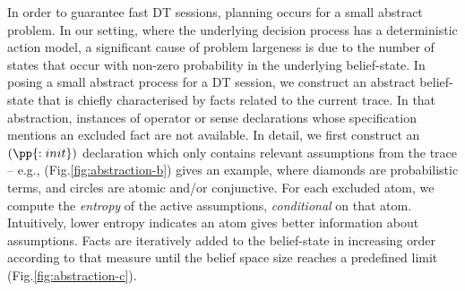 In order to guarantee fast DT sessions, planning occurs for a small
abstract problem. In our setting, where the underlying decision
process has a deterministic action model, a significant cause of
problem largeness is due to the number of states that occur with
non-zero probability in the underlying belief-state. In posing a small
abstract process for a DT session, we construct an abstract
belief-state that is chiefly characterised by facts related to the
current trace. In that abstraction, instances of operator or sense
declarations whose specification mentions an excluded fact are not
available.
In detail, we first construct an $(\pp{:init})$ declaration which only
contains relevant assumptions from the trace -- e.g.,
(Fig.\ref{fig:abstraction-b}) gives an example, where diamonds are
probabilistic terms, and circles are atomic and/or conjunctive.
For each excluded atom, we compute the {\em entropy} of the active
assumptions, {\em conditional} on that atom. Intuitively, lower
entropy indicates an atom gives better information about
assumptions. Facts are iteratively added to the belief-state in
increasing order according to that measure until the belief space size
reaches a predefined limit (Fig.\ref{fig:abstraction-c}).


